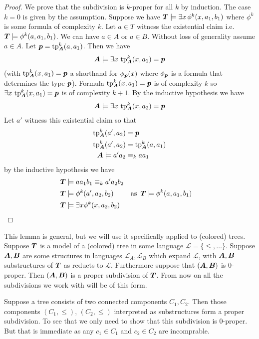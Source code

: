 \documentclass{amsart}
\DeclareMathOperator{\TT}{\boldface T}
\DeclareMathOperator{\A}{\boldface A}
\DeclareMathOperator{\B}{\boldface B}
\renewcommand{\LL}{\mathcal L}
\begin{document}
\begin{proof}
	We prove that the subdivision is $k$-proper for all $k$ by induction.
        The case $k = 0$ is given by the assumption.
        Suppose we have $\TT \models \exists x \, \phi^k(x, a_1, b_1)$ where $\phi^k$ is some formula of complexity $k$. Let $a \in T$ witness the existential claim i.e. $\TT \models \phi^k(a, a_1, b_1)$. We can have $a \in A$ or $a \in B$. Without loss of generality assume $a \in A$. Let $\pp = \tp^k_{\A} (a, a_1)$. Then we have 
	\begin{align*}
          \A \models \exists x \, \tp^k_{\A}(x, a_1) = \pp
	\end{align*}
        (with $\tp^k_{\A}(x, a_1) = \pp$ a shorthand for $\phi_{\operatorname{\boldsymbol p}}(x)$ where $\phi_{\operatorname{\boldsymbol p}}$ is a formula that determines the type $\operatorname{\boldsymbol p}$).
	Formula $\tp^k_{\A}(x, a_1) = \pp$ is of complexity $k$ so $\exists x \, \tp^k_{\A}(x, a_1) = \pp$ is of complexity $k+1$. By the inductive hypothesis we have
	\begin{align*}
		\A \models \exists x \, \tp^k_{\A}(x, a_2) = \pp
	\end{align*}
	Let $a'$ witness this existential claim so that  
	\begin{align*}
		\tp^k_{\A}(a', a_2) &= \pp \\
		\tp^k_{\A}(a', a_2) &= \tp^k_{\A}(a, a_1) \\
		\A \models a'a_2 &\equiv_k aa_1
	\end{align*}
	by the inductive hypothesis we have
	\begin{align*}
		\TT &\models aa_1b_1 \equiv_k a'a_2b_2 \\
		\TT &\models \phi^k(a', a_2, b_2) & \text {as } \TT &\models \phi^k(a, a_1, b_1)\\
		\TT &\models \exists x \phi^k(x, a_2, b_2)
	\end{align*}
\end{proof}

This lemma is general, but we will use it specifically applied to (colored) trees.
Suppose $\TT$ is a model of a (colored) tree in some language $\LL = \{\leq, \ldots\}$.
Suppose $\A, \B$ are some structures in languages $\LL_A, \LL_B$ which expand $\LL$, with $\A, \B$ substructures of $\TT$ as reducts to $\LL$.
Furthermore suppose that $(\A, \B)$ is 0-proper.
Then $(\A, \B)$ is a proper subdivision of $\TT$.
From now on all the subdivisions we work with will be of this form.

\begin{Example} \label{ex_disc}
  Suppose a tree consists of two connected components $C_1, C_2$.
  Then those components $(C_1, \leq)$, $(C_2, \leq)$ interpreted as substructures form a proper subdivision.
  To see that we only need to show that this subdivision is 0-proper.
  But that is immediate as any $c_1 \in C_1$ and $c_2 \in C_2$ are incomprable.
\end{Example}
\end{document}
